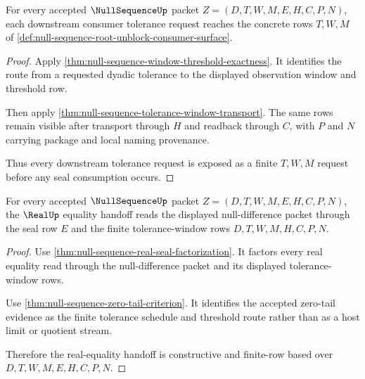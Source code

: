 \begin{theorem}
\label{thm:null-sequence-root-tolerance-schedule-exposure}
For every accepted $\NullSequenceUp$ packet $Z=(D,T,W,M,E,H,C,P,N)$, each downstream consumer tolerance request reaches the concrete rows $T,W,M$ of \autoref{def:null-sequence-root-unblock-consumer-surface}.
\end{theorem}
\begin{proof}
Apply \autoref{thm:null-sequence-window-threshold-exactness}. It identifies the route from a requested dyadic tolerance to the displayed observation window and threshold row.

Then apply \autoref{thm:null-sequence-tolerance-window-transport}. The same rows remain visible after transport through $H$ and readback through $C$, with $P$ and $N$ carrying package and local naming provenance.

Thus every downstream tolerance request is exposed as a finite $T,W,M$ request before any seal consumption occurs.
\end{proof}

\begin{theorem}
\label{thm:null-sequence-root-real-equality-handoff}
For every accepted $\NullSequenceUp$ packet $Z=(D,T,W,M,E,H,C,P,N)$, the $\RealUp$ equality handoff reads the displayed null-difference packet through the seal row $E$ and the finite tolerance-window rows $D,T,W,M,H,C,P,N$.
\end{theorem}
\begin{proof}
Use \autoref{thm:null-sequence-real-seal-factorization}. It factors every real equality read through the null-difference packet and its displayed tolerance-window rows.

Use \autoref{thm:null-sequence-zero-tail-criterion}. It identifies the accepted zero-tail evidence as the finite tolerance schedule and threshold route rather than as a host limit or quotient stream.

Therefore the real-equality handoff is constructive and finite-row based over $D,T,W,M,E,H,C,P,N$.
\end{proof}

